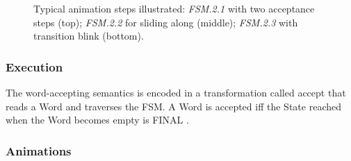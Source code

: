 \begin{figure}[t]
  \caption{Typical animation steps illustrated: \emph{FSM.2.1} with two acceptance
   steps (top); \emph{FSM.2.2} for sliding along (middle);
   \emph{FSM.2.3} with transition blink (bottom).}%
   \label{fig:FSM_ANIMATION}%
\end{figure}

\subsubsection{Execution}
\label{sec:Examples:FSM:Execution}

The word-accepting semantics is encoded in a transformation called
\textsf{accept} that reads a \textsf{Word} and traverses the \textsf{FSM}. A 
\textsf{Word} is accepted iff the \textsf{State} reached when the \textsf{Word} 
becomes empty is \textsf{FINAL} .

\subsubsection{Animations}
\label{sec:Examples:FSM:Animations}

